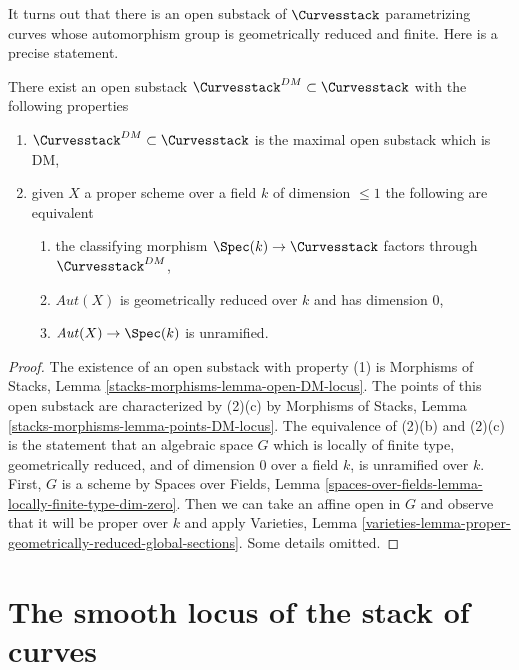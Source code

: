 \noindent
It turns out that there is an open substack of
$\Curvesstack$ parametrizing curves whose automorphism
group is geometrically reduced and finite.
Here is a precise statement.

\begin{lemma}
\label{lemma-DM-part-curves}
There exist an open substack $\Curvesstack^{DM} \subset \Curvesstack$
with the following properties
\begin{enumerate}
\item $\Curvesstack^{DM} \subset \Curvesstack$ is the maximal
open substack which is DM,
\item given $X$ a proper scheme over a field $k$ of dimension $\leq 1$
the following are equivalent
\begin{enumerate}
\item the classifying morphism $\Spec(k) \to \Curvesstack$ factors
through $\Curvesstack^{DM}$,
\item $\mathit{Aut}(X)$ is geometrically reduced over $k$ and
has dimension $0$,
\item $\mathit{Aut}(X) \to \Spec(k)$ is unramified.
\end{enumerate}
\end{enumerate}
\end{lemma}

\begin{proof}
The existence of an open substack with property (1) is
Morphisms of Stacks, Lemma \ref{stacks-morphisms-lemma-open-DM-locus}.
The points of this open substack are characterized by (2)(c) by
Morphisms of Stacks, Lemma \ref{stacks-morphisms-lemma-points-DM-locus}.
The equivalence of (2)(b) and (2)(c) is the statement that an
algebraic space $G$ which is locally of finite type, geometrically reduced,
and of dimension $0$ over a field $k$, is unramified over $k$.
First, $G$ is a scheme by Spaces over Fields, Lemma
\ref{spaces-over-fields-lemma-locally-finite-type-dim-zero}.
Then we can take an affine open in $G$ and observe
that it will be proper over $k$ and apply
Varieties, Lemma
\ref{varieties-lemma-proper-geometrically-reduced-global-sections}.
Some details omitted.
\end{proof}






\section{The smooth locus of the stack of curves}
\label{section-smooth}

